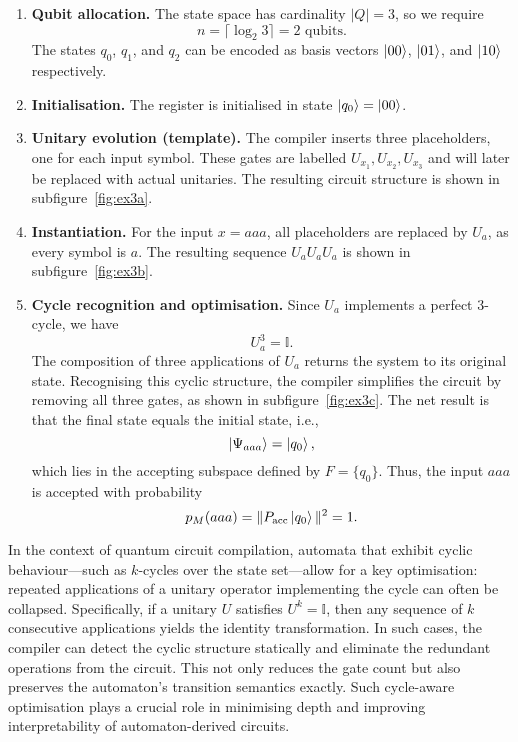 \begin{enumerate}
  \item \textbf{Qubit allocation.} The state space has cardinality $|Q| = 3$, so we require
  \[
  n = \lceil \log_2 3 \rceil = 2 \text{ qubits}.
  \]
  The states $q_0$, $q_1$, and $q_2$ can be encoded as basis vectors $\ket{00}$, $\ket{01}$, and $\ket{10}$ respectively.

  \item \textbf{Initialisation.} The register is initialised in state $\ket{q_0} = \ket{00}$.

  \item \textbf{Unitary evolution (template).} The compiler inserts three placeholders, one for each input symbol. These gates are labelled $\boxed{U_{x_1}}, \boxed{U_{x_2}}, \boxed{U_{x_3}}$ and will later be replaced with actual unitaries. The resulting circuit structure is shown in subfigure~\ref{fig:ex3a}.

  \item \textbf{Instantiation.} For the input $x = aaa$, all placeholders are replaced by $U_a$, as every symbol is $a$. The resulting sequence $U_a U_a U_a$ is shown in subfigure~\ref{fig:ex3b}.

  \item \textbf{Cycle recognition and optimisation.} Since $U_a$ implements a perfect 3-cycle, we have
  \[
  U_a^3 = \mathbb{I}.
  \]
  The composition of three applications of $U_a$ returns the system to its original state. Recognising this cyclic structure, the compiler simplifies the circuit by removing all three gates, as shown in subfigure~\ref{fig:ex3c}. The net result is that the final state equals the initial state, i.e.,
  \[
  \ket{\Psi_{aaa}} = \ket{q_0},
  \]
  which lies in the accepting subspace defined by $F = \{q_0\}$. Thus, the input $aaa$ is accepted with probability
  \[
  p_M(aaa) = \|P_{\text{acc}} \ket{q_0}\|^2 = 1.
  \]
\end{enumerate}

In the context of quantum circuit compilation, automata that exhibit cyclic behaviour—such as $k$-cycles over the state set—allow for a key optimisation: repeated applications of a unitary operator implementing the cycle can often be collapsed. Specifically, if a unitary $U$ satisfies $U^k = \mathbb{I}$, then any sequence of $k$ consecutive applications yields the identity transformation. In such cases, the compiler can detect the cyclic structure statically and eliminate the redundant operations from the circuit. This not only reduces the gate count but also preserves the automaton’s transition semantics exactly. Such cycle-aware optimisation plays a crucial role in minimising depth and improving interpretability of automaton-derived circuits.

